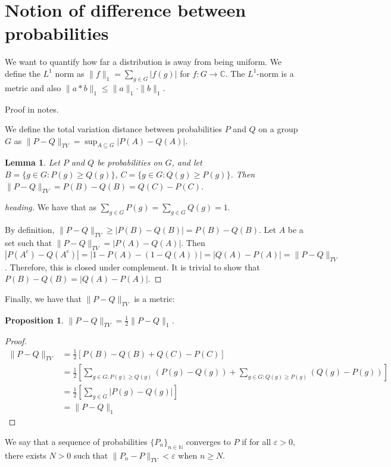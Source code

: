 \documentclass[]{article}
\newtheorem{proposition}[theorem]{Proposition}
\newtheorem{lemma}[theorem]{Lemma}
\theoremstyle{definition}
\numberwithin{theorem}{section}
\numberwithin{equation}{section}
\begin{document}
\section{Notion of difference between probabilities}
We want to quantify how far a distribution is away from being uniform. We define the $L^1$ norm as $\|f\|_1 = \sum_{g \in G} |f(g)|$ for $f : G \rightarrow \mathbb{C}$. The $L^1$-norm is a metric and also $\|a \ast b\|_1 \leq \|a\|_1 \cdot \|b\|_1$. 

Proof in notes.

We define the total variation distance between probabilities $P$ and $Q$ on a group $G$ as $\| P - Q\|_{TV} = \sup_{A \subseteq G} |P(A) - Q(A)|$. 

\begin{lemma}
	Let $P$ and $Q$ be probabilities on $G$, and let $B = \lbrace g \in G : P(g) \geq Q(g) \rbrace$, $C = \lbrace g \in G : Q(g) \geq P(g) \rbrace$.
	Then $\|P - Q \|_{TV} = P(B) - Q(B) = Q(C) - P(C)$.
\end{lemma}
\begin{proof}[heading]
	We have that as $\sum_{g \in G} P(g) = \sum_{g \in G} Q(g) = 1$. 
	
	
	By definition, $\|P - Q\|_{TV} \geq |P(B) - Q(B)| = P(B) - Q(B)$.
	Let $A$ be a set such that $\|P - Q\|_{TV} = |P(A) - Q(A)|.$ Then $|P(A^c) - Q(A^c)| = |1 - P(A) - (1 - Q(A))| = |Q(A) - P(A)| = \|P - Q \|_{TV}$. Therefore, this is closed under complement. It is trivial to show that $P(B) - Q(B) = |Q(A) - P(A)|$. 
\end{proof}
Finally, we have that $\|P - Q \|_{TV}$ is a metric:
\begin{proposition}
	$\|P - Q\|_{TV} = \frac{1}{2} \|P - Q \|_1$. 
\end{proposition}

\begin{proof}
	\begin{align*}
		\|P - Q\|_{TV} &= \frac{1}{2}[P(B) - Q(B) + Q(C) - P(C)]\\
		&=\frac{1}{2}\left[ \sum_{g \in G : P(g) \geq Q(g)} (P(g) - Q(g)) + \sum_{g \in G : Q(g) \geq P(g)} (Q(g) - P(g)) \right]\\
		&= \frac{1}{2}\left[ \sum_{g \in G}|P(g) - Q(g)| \right]\\
		&= \|P - Q\|_1
	\end{align*}
\end{proof}

We say that a sequence of probabilities $\lbrace P_n \rbrace_{n \in \mathbb{N}}$ converges to $P$ if for all $\varepsilon > 0$, there exists $N > 0$ such that $\|P_n - P \|_{TV} < \varepsilon$ when $n \geq N$. 
\end{document}
